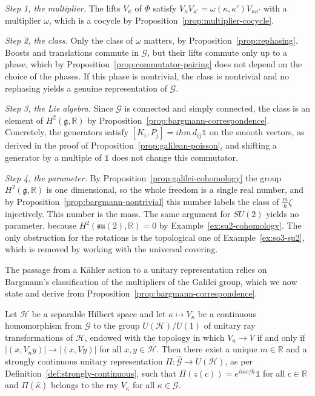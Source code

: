 \begin{remark}\label{rem:bargmann-galilei}
	\emph{Step 1, the multiplier.} The lifts $V_\kappa$ of $\Phi$ satisfy $V_\kappa V_{\kappa'}=\omega(\kappa,\kappa')V_{\kappa\kappa'}$ with a multiplier $\omega$, which is a cocycle by Proposition~\ref{prop:multiplier-cocycle}.
	
	\emph{Step 2, the class.} Only the class of $\omega$ matters, by Proposition~\ref{prop:rephasing}. Boosts and translations commute in $\mathcal{G}$, but their lifts commute only up to a phase, which by Proposition~\ref{prop:commutator-pairing} does not depend on the choice of the phases. If this phase is nontrivial, the class is nontrivial and no rephasing yields a genuine representation of $\mathcal{G}$.
	
	\emph{Step 3, the Lie algebra.} Since $\mathcal{G}$ is connected and simply connected, the class is an element of $H^2(\mathfrak{g},\mathbb{R})$ by Proposition~\ref{prop:bargmann-correspondence}. Concretely, the generators satisfy $[K_i,P_j]=i\hbar m\,d_{ij}\mathbb{1}$ on the smooth vectors, as derived in the proof of Proposition~\ref{prop:galilean-poisson}, and shifting a generator by a multiple of $\mathbb{1}$ does not change this commutator.
	
	\emph{Step 4, the parameter.} By Proposition~\ref{prop:galilei-cohomology} the group $H^2(\mathfrak{g},\mathbb{R})$ is one dimensional, so the whole freedom is a single real number, and by Proposition~\ref{prop:bargmann-nontrivial} this number labels the class of $\frac{m}{\hbar}\zeta$ injectively. This number is the mass. The same argument for $SU(2)$ yields no parameter, because $H^2(\mathfrak{su}(2),\mathbb{R})=0$ by Example~\ref{ex:su2-cohomology}. The only obstruction for the rotations is the topological one of Example~\ref{ex:so3-su2}, which is removed by working with the universal covering.
\end{remark}

The passage from a Kähler action to a unitary representation relies on Bargmann's classification of the multipliers of the Galilei group, which we now state and derive from Proposition~\ref{prop:bargmann-correspondence}.

\begin{theorem}[Bargmann]\label{thm:bargmann}
	Let $\mathcal{H}$ be a separable Hilbert space and let $\kappa\mapsto V_\kappa$ be a continuous homomorphism from $\mathcal{G}$ to the group $U(\mathcal{H})/U(1)$ of unitary ray transformations of $\mathcal{H}$, endowed with the topology in which $V_n\to V$ if and only if $|(x,V_ny)|\to|(x,Vy)|$ for all $x,y\in\mathcal{H}$. Then there exist a unique $m\in\mathbb{R}$ and a strongly continuous unitary representation $\Pi:\widehat{\mathcal{G}}\to U(\mathcal{H})$, as per Definition~\ref{def:strongly-continuous}, such that $\Pi(z(c))=e^{imc/\hbar}\mathbb{1}$ for all $c\in\mathbb{R}$ and $\Pi(\hat\kappa)$ belongs to the ray $V_\kappa$ for all $\kappa\in\mathcal{G}$.
\end{theorem}

